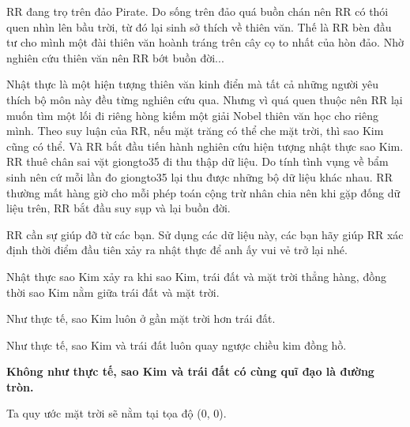 RR đang trọ trên đảo Pirate. Do sống trên đảo quá buồn chán nên RR có thói quen nhìn lên bầu trời, từ đó lại sinh sở thích về thiên văn. Thế là RR bèn đầu tư cho mình một đài thiên văn hoành tráng trên cây cọ to nhất của hòn đảo. Nhờ nghiên cứu thiên văn nên RR bớt buồn đời...  

   Nhật thực là một hiện tượng thiên văn kinh điển mà tất cả những người yêu thích bộ môn này đều từng nghiên cứu qua. Nhưng vì quá quen thuộc nên RR lại muốn tìm một lối đi riêng hòng kiếm một giải Nobel thiên văn học cho riêng mình. Theo suy luận của RR, nếu mặt trăng có thể che mặt trời, thì sao Kim cũng có thể. Và RR bắt đầu tiến hành nghiên cứu hiện tượng nhật thực sao Kim. RR thuê chân sai vặt giongto35 đi thu thập dữ liệu. Do tính tình vụng về bẩm sinh nên cứ mỗi lần đo giongto35 lại thu được những bộ dữ liệu khác nhau. RR thường mất hàng giờ cho mỗi phép toán cộng trừ nhân chia nên khi gặp đống dữ liệu trên, RR bắt đầu suy sụp và lại buồn đời.  

   RR cần sự giúp đỡ từ các bạn. Sử dụng các dữ liệu này, các bạn hãy giúp RR xác định thời điểm đầu tiên xảy ra nhật thực để anh ấy vui vẻ trở lại nhé.  

   Nhật thực sao Kim xảy ra khi sao Kim, trái đất và mặt trời thẳng hàng, đồng thời sao Kim nằm giữa trái đất và mặt trời.  

   Như thực tế, sao Kim luôn ở gần mặt trời hơn trái đất.  

   Như thực tế, sao Kim và trái đất luôn quay ngược chiều kim đồng hồ.  

\textbf{    Không như thực tế, sao Kim và trái đất có cùng quĩ đạo là đường tròn.   }

   Ta quy ước mặt trời sẽ nằm tại tọa độ (0, 0).